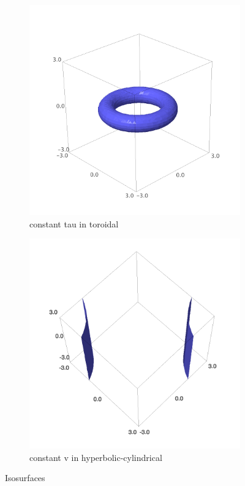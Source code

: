 \documentclass{article}
\begin{document}
\begin{figure}
\begin{subfigure}[b]{0.3\textwidth}
        \includegraphics[width=\textwidth]{images/toroidal_tau.png}
        \caption{constant tau in toroidal}
    \end{subfigure}
    \begin{subfigure}[b]{0.3\textwidth}
        \includegraphics[width=\textwidth]{images/hyperbolic_v.png}
        \caption{constant v in hyperbolic-cylindrical}
    \end{subfigure}
\label{fig:surface}
\caption{Isosurfaces}
\end{figure}
\end{document}
